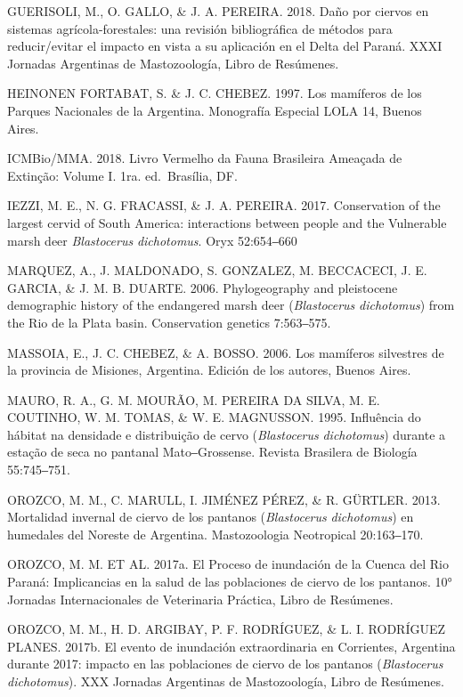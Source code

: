 \documentclass[
  x11names]{article}
\begin{document}
GUERISOLI, M., O. GALLO, \& J. A. PEREIRA. 2018. Daño por ciervos en
sistemas agrícola-forestales: una revisión bibliográfica de métodos para
reducir/evitar el impacto en vista a su aplicación en el Delta del
Paraná. XXXI Jornadas Argentinas de Mastozoología, Libro de Resúmenes.

HEINONEN FORTABAT, S. \& J. C. CHEBEZ. 1997. Los mamíferos de los
Parques Nacionales de la Argentina. Monografía Especial LOLA 14, Buenos
Aires.

ICMBio/MMA. 2018. Livro Vermelho da Fauna Brasileira Ameaçada de
Extinção: Volume I. 1ra. ed.~Brasília, DF.

IEZZI, M. E., N. G. FRACASSI, \& J. A. PEREIRA. 2017. Conservation of
the largest cervid of South America: interactions between people and the
Vulnerable marsh deer \textit{Blastocerus} \textit{dichotomus}. Oryx
52:654‒660

MARQUEZ, A., J. MALDONADO, S. GONZALEZ, M. BECCACECI, J. E. GARCIA, \&
J. M. B. DUARTE. 2006. Phylogeography and pleistocene demographic
history of the endangered marsh deer (\textit{Blastocerus}
\textit{dichotomus}) from the Rio de la Plata basin. Conservation
genetics 7:563‒575.

MASSOIA, E., J. C. CHEBEZ, \& A. BOSSO. 2006. Los mamíferos silvestres
de la provincia de Misiones, Argentina. Edición de los autores, Buenos
Aires.

MAURO, R. A., G. M. MOURÃO, M. PEREIRA DA SILVA, M. E. COUTINHO, W. M.
TOMAS, \& W. E. MAGNUSSON. 1995. Influência do hábitat na densidade e
distribuição de cervo (\textit{Blastocerus} \textit{dichotomus}) durante
a estação de seca no pantanal Mato‒Grossense. Revista Brasilera de
Biología 55:745‒751.

OROZCO, M. M., C. MARULL, I. JIMÉNEZ PÉREZ, \& R. GÜRTLER. 2013.
Mortalidad invernal de ciervo de los pantanos (\textit{Blastocerus}
\textit{dichotomus}) en humedales del Noreste de Argentina.
Mastozoologia Neotropical 20:163‒170.

OROZCO, M. M. ET AL. 2017a. El Proceso de inundación de la Cuenca del
Rio Paraná: Implicancias en la salud de las poblaciones de ciervo de los
pantanos. 10° Jornadas Internacionales de Veterinaria Práctica, Libro de
Resúmenes.

OROZCO, M. M., H. D. ARGIBAY, P. F. RODRÍGUEZ, \& L. I. RODRÍGUEZ
PLANES. 2017b. El evento de inundación extraordinaria en Corrientes,
Argentina durante 2017: impacto en las poblaciones de ciervo de los
pantanos (\textit{Blastocerus} \textit{dichotomus}). XXX Jornadas
Argentinas de Mastozoología, Libro de Resúmenes.
\end{document}
